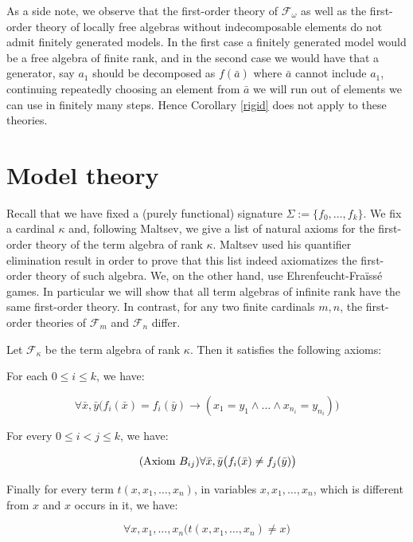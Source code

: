 \documentclass[a4paper,11pt]{article}
\begin{document}
As a side note, we observe that the first-order theory of $\mathcal{F}_\omega$ as well as the first-order theory of locally free algebras without indecomposable elements do not admit finitely generated models. In the first case a finitely generated model would be a free algebra of finite rank, and in the second case we would have that a generator, say $a_1$ should be decomposed as $f(\bar a)$ where $\bar a$ cannot include $a_1$, continuing repeatedly choosing an element from $\bar a$ we will run out of elements we can use in finitely many steps. Hence Corollary \ref{rigid} does not apply to these theories.

\section{Model theory}\label{section 3}


Recall that we have fixed a (purely functional) signature $\Sigma:=\{f_0, \ldots, f_k\}$. We fix a cardinal $\kappa$ and, following Maltsev, we give a list of natural axioms for the first-order theory of the term algebra of rank $\kappa$. Maltsev used his quantifier elimination result in order to prove that this list indeed axiomatizes the first-order theory of such algebra.  We, on the other hand, use Ehrenfeucht-Fra\"iss\'e games. In particular we will show that all term algebras of infinite rank have the same first-order theory. In contrast, for any two finite cardinals $m,n$, the first-order theories of $\mathcal{F}_m$ and $\mathcal{F}_n$ differ.

Let $\mathcal{F}_\kappa$ be the term algebra of rank $\kappa$. Then it satisfies the following axioms:


For each $0\leq i\leq k$, we have:

\begin{equation}
\tag{Axiom $A_i$}
\forall \bar x,\bar y \big(f_i(\bar x)=f_i(\bar y)\rightarrow (x_1=y_1\land\ldots\land x_{n_i}=y_{n_i})\big)
\end{equation}

For every $0\leq i<j\leq k$, we have:

\begin{equation}
\tag{Axiom $B_{ij}$}
\forall \bar x,\bar y \big(f_i(\bar x)\neq f_j(\bar y)\big)
\end{equation}

Finally for every term $t(x,x_1,\ldots,x_n)$, in variables $x,x_1,\ldots,x_n$, which is different from $x$ and $x$ occurs in it, we have: 

\begin{equation}
\tag{Axiom $C_t$}
\forall  x, x_1,\ldots, x_n \big(t(x,x_1,\ldots,x_n)\neq x\big)
\end{equation}
\end{document}
